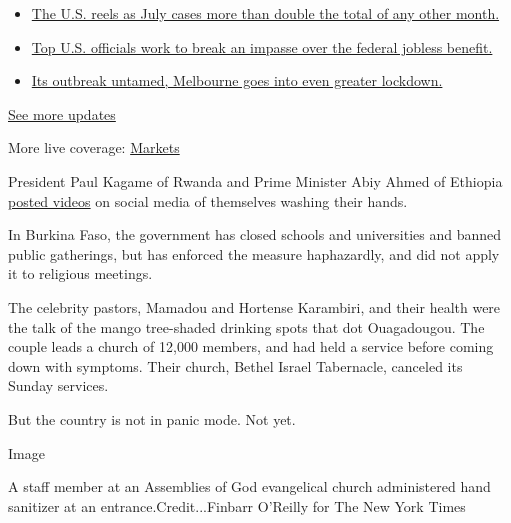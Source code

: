 \begin{itemize}
\tightlist
\item
  \href{https://www.nytimes.com/2020/08/01/world/coronavirus-covid-19.html?action=click\&pgtype=Article\&state=default\&region=MAIN_CONTENT_1\&context=storylines_live_updates\#link-34047410}{The
  U.S. reels as July cases more than double the total of any other
  month.}
\item
  \href{https://www.nytimes.com/2020/08/01/world/coronavirus-covid-19.html?action=click\&pgtype=Article\&state=default\&region=MAIN_CONTENT_1\&context=storylines_live_updates\#link-780ec966}{Top
  U.S. officials work to break an impasse over the federal jobless
  benefit.}
\item
  \href{https://www.nytimes.com/2020/08/01/world/coronavirus-covid-19.html?action=click\&pgtype=Article\&state=default\&region=MAIN_CONTENT_1\&context=storylines_live_updates\#link-2bc8948}{Its
  outbreak untamed, Melbourne goes into even greater lockdown.}
\end{itemize}

\href{https://www.nytimes.com/2020/08/01/world/coronavirus-covid-19.html?action=click\&pgtype=Article\&state=default\&region=MAIN_CONTENT_1\&context=storylines_live_updates}{See
more updates}

More live coverage:
\href{https://www.nytimes.com/live/2020/07/31/business/stock-market-today-coronavirus?action=click\&pgtype=Article\&state=default\&region=MAIN_CONTENT_1\&context=storylines_live_updates}{Markets}

President Paul Kagame of Rwanda and Prime Minister Abiy Ahmed of
Ethiopia
\href{https://twitter.com/PaulKagame/status/1239263206691999748?s=20}{posted
videos} on social media of themselves washing their hands.

In Burkina Faso, the government has closed schools and universities and
banned public gatherings, but has enforced the measure haphazardly, and
did not apply it to religious meetings.

The celebrity pastors, Mamadou and Hortense Karambiri, and their health
were the talk of the mango tree-shaded drinking spots that dot
Ouagadougou. The couple leads a church of 12,000 members, and had held a
service before coming down with symptoms. Their church, Bethel Israel
Tabernacle, canceled its Sunday services.

But the country is not in panic mode. Not yet.

Image

A staff member at an Assemblies of God evangelical church administered
hand sanitizer at an entrance.Credit...Finbarr O'Reilly for The New York
Times

